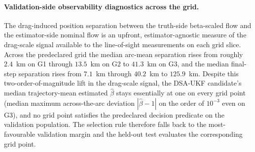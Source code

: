 \documentclass{article}
\begin{document}


\paragraph{Validation-side observability diagnostics across the grid.}
The drag-induced position separation between the truth-side beta-scaled flow and the estimator-side nominal flow is an upfront, estimator-agnostic measure of the drag-scale signal available to the line-of-sight measurements on each grid slice. Across the predeclared grid the median arc-mean separation rises from roughly $2.4$~km on G1 through $13.5$~km on G2 to $41.3$~km on G3, and the median final-step separation rises from $7.1$~km through $40.2$~km to $125.9$~km. Despite this two-order-of-magnitude lift in the drag-scale signal, the DSA-UKF candidate's median trajectory-mean estimated $\hat{\beta}$ stays essentially at one on every grid point (median maximum across-the-arc deviation $|\hat{\beta}-1|$ on the order of $10^{-3}$ even on G3), and no grid point satisfies the predeclared decision predicate on the validation population. The selection rule therefore falls back to the most-favourable validation margin and the held-out test evaluates the corresponding grid point.
\end{document}
